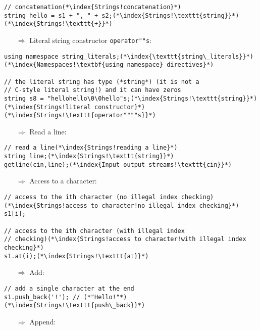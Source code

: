 \documentclass[10pt]{book}
\begin{document}
\begin{lstlisting}
// concatenation(*\index{Strings!concatenation}*)
string hello = s1 + ", " + s2;(*\index{Strings!\texttt{string}}*)(*\index{Strings!\texttt{+}}*)
\end{lstlisting}
\begin{enumerate}
\item[$\Rightarrow$] Literal string constructor \texttt{operator""s}:
\end{enumerate}
\begin{lstlisting}
using namespace string_literals;(*\index{\texttt{string\_literals}}*)(*\index{Namespaces!\textbf{using namespace} directives}*)

// the literal string has type (*string*) (it is not a 
// C-style literal string!) and it can have zeros
string s8 = "hellohello\0\0hello"s;(*\index{Strings!\texttt{string}}*)(*\index{Strings!literal constructor}*)(*\index{Strings!\texttt{operator""""s}}*)
\end{lstlisting}
\begin{enumerate}
\item[$\Rightarrow$] Read a line:
\end{enumerate}
\begin{lstlisting}
// read a line(*\index{Strings!reading a line}*)
string line;(*\index{Strings!\texttt{string}}*)
getline(cin,line);(*\index{Input-output streams!\texttt{cin}}*)
\end{lstlisting}
\begin{enumerate}
\item[$\Rightarrow$] Access to a character:
\end{enumerate}
\begin{lstlisting}
// access to the ith character (no illegal index checking)(*\index{Strings!access to character!no illegal index checking}*)
s1[i];

// access to the ith character (with illegal index
// checking)(*\index{Strings!access to character!with illegal index checking}*)
s1.at(i);(*\index{Strings!\texttt{at}}*)
\end{lstlisting}
\begin{enumerate}
\item[$\Rightarrow$] Add:
\end{enumerate}
\begin{lstlisting}
// add a single character at the end
s1.push_back('!'); // (*"Hello!"*)(*\index{Strings!\texttt{push\_back}}*)
\end{lstlisting}
\begin{enumerate}
\item[$\Rightarrow$] Append:
\end{enumerate}
\end{document}
